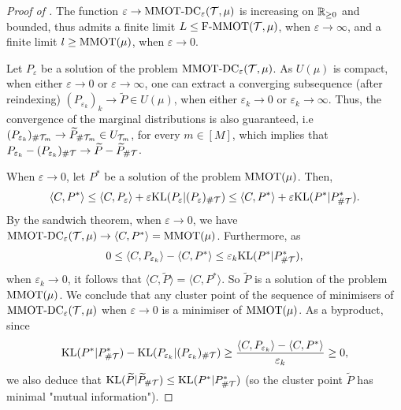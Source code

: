 \begin{proof}[Proof of ]
The function $\varepsilon \to \text{MMOT-DC}_{\varepsilon}(\mathcal T, \mu)$ is increasing on $\mathbb R_{\geq 0}$ and bounded,
thus admits a finite limit $L \leq \text{F-MMOT}(\mathcal T, \mu)$, when $\varepsilon \to \infty$, and a finite limit
$l \geq \text{MMOT}(\mu)$, when $\varepsilon \to 0$.

Let $P_{\varepsilon}$ be a solution of the problem $\text{MMOT-DC}_{\varepsilon}(\mathcal T, \mu)$.
As $U(\mu)$ is compact, when either $\varepsilon \to 0$ or $\varepsilon \to \infty$,
one can extract a converging subsequence (after reindexing)
$(P_{\varepsilon_k})_k \to \widetilde{P} \in U(\mu)$,
when either $\varepsilon_k \to 0$ or $\varepsilon_k \to \infty$.
Thus, the convergence of the marginal distributions is also guaranteed, i.e
$(P_{\varepsilon_k})_{\# \mathcal T_m} \to \widetilde{P}_{\# \mathcal T_m} \in U_{\mathcal T_m}$, for every $m \in [M]$,
which implies that $P_{\varepsilon_k} - (P_{\varepsilon_k})_{\# \mathcal T} \to \widetilde{P} - \widetilde{P}_{\# \mathcal T}$.

When $\varepsilon \to 0$, let $P^{*}$ be a solution of the problem $\text{MMOT}(\mu)$. Then,
\begin{equation}
  \langle C, P^* \rangle \leq \langle C, P_{\varepsilon} \rangle +
  \varepsilon \text{KL}(P_{\varepsilon} \vert (P_{\varepsilon})_{\# \mathcal T}) \leq
  \langle C, P^* \rangle + \varepsilon \text{KL}(P^* \vert P^*_{\# \mathcal T}).
\end{equation}
By the sandwich theorem, when $\varepsilon \to 0$, we have
$\text{MMOT-DC}_{\varepsilon}(\mathcal T, \mu) \to \langle C, P^* \rangle = \text{MMOT}(\mu)$.
Furthermore, as
\begin{equation}
  0 \leq \langle C, P_{\varepsilon_k} \rangle - \langle C, P^* \rangle
  \leq \varepsilon_k \text{KL}(P^* \vert P^*_{\# \mathcal T}),
\end{equation}
when $\varepsilon_k \to 0$, it follows that $\langle C, \widetilde{P} \rangle = \langle C, P^* \rangle$.
So $\widetilde{P}$ is a solution of the problem $\text{MMOT}(\mu)$. We conclude that
any cluster point of the sequence of minimisers of $\text{MMOT-DC}_{\varepsilon}(\mathcal T, \mu)$ when
$\varepsilon \to 0$ is a minimiser of $\text{MMOT}(\mu)$. As a byproduct, since
\begin{equation}
  \text{KL}(P^* \vert P^*_{\# \mathcal T}) - \text{KL}(P_{\varepsilon_k} \vert (P_{\varepsilon_k})_{\# \mathcal T}) \geq
  \frac{\langle C, P_{\varepsilon_k} \rangle - \langle C, P^* \rangle}{\varepsilon_k} \geq 0,
\end{equation}
we also deduce that $\text{KL}(\widetilde{P} \vert \widetilde{P}_{\# \mathcal T}) \leq \text{KL}(P^* \vert P^*_{\# \mathcal T})$
(so the cluster point $\widetilde{P}$ has minimal "mutual information").


\end{proof}
